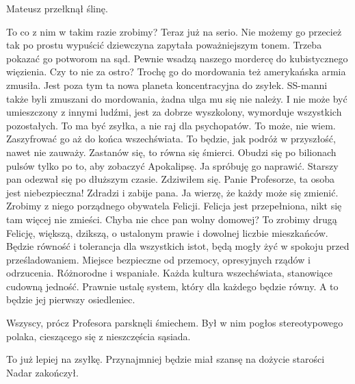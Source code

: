 Mateusz przełknął ślinę.

\begin{dialogue}
\ds{} To co z nim w takim razie zrobimy? Teraz już na serio. Nie możemy go przecież tak po prostu wypuścić \dm{} dziewczyna zapytała poważniejszym tonem.
\ds{} Trzeba pokazać go potworom na sąd. Pewnie wsadzą naszego mordercę do kubistycznego więzienia.
\ds{} Czy to nie za ostro? Trochę go do mordowania też amerykańska armia zmusiła. Jest poza tym ta nowa planeta koncentracyjna do zsyłek.
\ds{} SS-manni także byli zmuszani do mordowania, żadna ulga mu się nie należy. 
I nie może być umieszczony z innymi ludźmi, jest za dobrze wyszkolony, wymorduje wszystkich pozostałych. To ma być zsyłka, a nie raj dla psychopatów.
\ds{} To może, nie wiem. Zaszyfrować go aż do końca wszechświata. To będzie, jak podróż w przyszłość, nawet nie zauważy.
\ds{} Zastanów się, to równa się śmierci. Obudzi się po bilionach pulsów tylko po to, aby zobaczyć Apokalipsę.
\ds{} Ja spróbuję go naprawić. \dm{} Starszy pan odezwał się po dłuższym czasie. Zdziwiłem się.
\ds{} Panie Profesorze, ta osoba jest niebezpieczna! Zdradzi i zabije pana.
\ds{} Ja wierzę, że każdy może się zmienić. Zrobimy z niego porządnego obywatela Felicji.
\ds{} Felicja jest przepełniona, nikt się tam więcej nie zmieści. Chyba nie chce pan wolny domowej?
\ds{} To zrobimy drugą Felicję, większą, dzikszą, o ustalonym prawie i dowolnej liczbie mieszkańców. Będzie równość i tolerancja dla wszystkich istot, będą mogły żyć w spokoju przed prześladowaniem.
Miejsce bezpieczne od przemocy, opresyjnych rządów i odrzucenia. Różnorodne i wspaniałe. Każda kultura wszechświata, stanowiące cudowną jedność.
Prawnie ustalę system, który dla każdego będzie równy.
A to będzie jej pierwszy osiedleniec.
\end{dialogue}

Wszyscy, prócz Profesora parsknęli śmiechem.
Był w nim pogłos stereotypowego polaka, cieszącego się z nieszczęścia sąsiada.

\begin{dialogue}
\ds{} To już lepiej na zsyłkę. Przynajmniej będzie miał szansę na dożycie starości \dm{} Nadar zakończył.
\end{dialogue}

